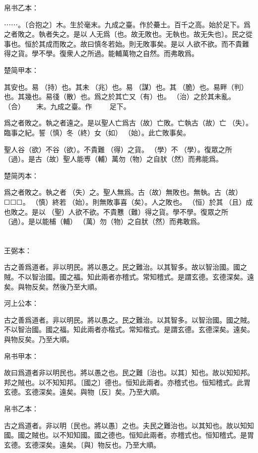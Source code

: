 \documentclass[a5paper]{ctexbook}
\begin{document}
    帛书乙本：

    ⋯⋯。〔合抱之〕木。生於毫末。九成之臺。作於虆土。百千之高。始於足下。爲之者敗之。執者失之。是以𦔻人无爲〔也。故无敗也。无執也。故无失也〕。民之從事也。恒於其成而敗之。故曰慎冬若始。則无敗事矣。是以𦔻人欲不欲。而不貴難得之貨。學不學。復衆人之所過。能輔萬物之自然。而弗敢爲。

    楚简甲本：

    其安也。易𣏔（持）也。其未󶵆（兆）也。易𢘃（謀）也。其󶵇（脆）也。易畔（判）也。其幾也。易㣤（散）也。爲之於其亡又（有）也。𥿆（治）之於其未亂。𣌭（合）☐☐☐☐☐☐末。九成之臺。作☐☐☐☐☐☐☐☐☐足下。

    爲之者敗之。執之者遠之。是以聖人亡爲古（故）亡敗。亡執古（故）亡󶴡（失）。臨事之紀。誓（慎）冬（終）女（如）󶴢（始）。此亡敗事矣。

    聖人谷（欲）不谷（欲）。不貴難󶴫（得）之貨。𡥈（學）不𡥈（學）。復眾之所󶴬（過）。是古（故）聖人能尃（輔）萬勿（物）之自肰（然）而弗能爲。

    楚简丙本：

    爲之者敗之。執之者󶴡（失）之。聖人無爲。古（故）無敗也。無執。古（故）☐☐☐。󶴤（慎）終若󶴪（始）。則無敗事喜（矣）。人之敗也。𠄨（恒）於其𠭯（且）成也敗之。是以☐（聖）人欲不欲。不貴戁（難）得之貨。學不學。復眾之所󶴭（過）。是以能㭪（輔）󼧕（萬）勿（物）之自肰（然）而弗敢爲。

    \chapter{}
    王弼本：

    古之善爲道者。非以明民。將以愚之。民之難治。以其智多。故以智治國。國之賊。不以智治國。國之福。知此兩者亦稽式。常知稽式。是謂玄德。玄德深矣。遠矣。與物反矣。然後乃至大順。

    河上公本：

    古之善爲道者。非以明民。將以愚之。民之難治。以其智多。以智治國。國之賊。不以智治國。國之福。知此兩者亦楷式。常知楷式。是謂玄德。玄德深矣。遠矣。與物反矣。乃至大順。

    帛书甲本：

    故曰爲道者非以明民也。將以愚之也。民之難〔治也。以其〕知也。故以知知邦。邦之賊也。以不知知邦。〔國之〕德也。恒知此兩者。亦稽式也。恒知稽式。此胃玄德。玄德深矣。遠矣。與物〔反〕矣。乃至大順。

    帛书乙本：

    古之爲道者。非以明〔民也。將以愚〕之也。夫民之難治也。以其知也。故以知知國。國之賊也。以不知知國。國之德也。恒知此兩者。亦稽式也。恒知稽式。是胃玄德。玄德深矣。遠矣。〔與〕物反也。乃至大順。
\end{document}
